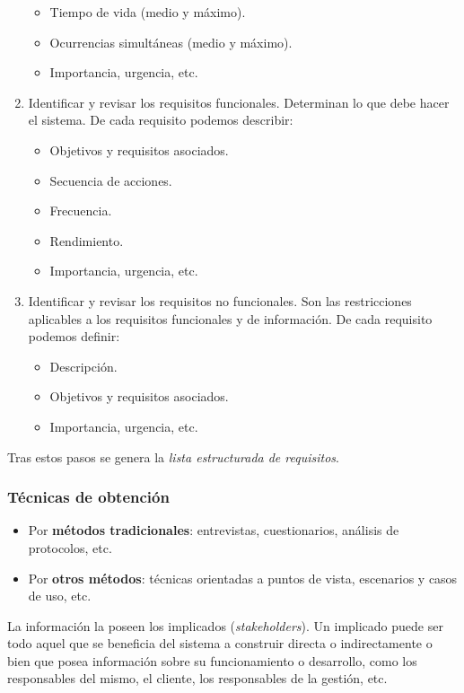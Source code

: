 \documentclass[12pt,spanish]{article}
\begin{document}
\begin{enumerate}
\begin{itemize}
			\item Tiempo de vida (medio y máximo).
			\item Ocurrencias simultáneas (medio y máximo).
			\item Importancia, urgencia, etc.
		\end{itemize}
	\item Identificar y revisar los requisitos funcionales. Determinan lo que debe hacer el sistema. De cada requisito podemos describir:
		\begin{itemize}
			\item Objetivos y requisitos asociados.
			\item Secuencia de acciones.
			\item Frecuencia.
			\item Rendimiento.
			\item Importancia, urgencia, etc.
		\end{itemize}
	\item Identificar y revisar los requisitos no funcionales. Son las restricciones aplicables a los requisitos funcionales y de información. De cada requisito podemos definir:
		\begin{itemize}
			\item Descripción.
			\item Objetivos y requisitos asociados.
			\item Importancia, urgencia, etc.
		\end{itemize}
\end{enumerate}
Tras estos pasos se genera la \emph{lista estructurada de requisitos}.

\subsubsection{Técnicas de obtención}

\begin{itemize}
	\item Por \textbf{métodos tradicionales}: entrevistas, cuestionarios, análisis de protocolos, etc.
	\item Por \textbf{otros métodos}: técnicas orientadas a puntos de vista, escenarios y casos de uso, etc.
\end{itemize}

La información la poseen los implicados (\textit{stakeholders}). Un implicado puede ser todo aquel que se beneficia del sistema a construir directa o indirectamente o bien que posea información sobre su funcionamiento o desarrollo, como los responsables del mismo, el cliente, los responsables de la gestión, etc.
\end{document}
